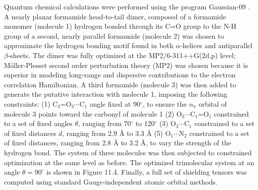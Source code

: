 \begin{doublespace}
Quantum chemical calculations were performed using the program Gaussian-09
\cite{gaussian2009}. A nearly planar formamide head-to-tail dimer,
composed of a formamide monomer (molecule 1) hydrogen bonded through its C=O
group to the N-H group of a second, nearly parallel formamide (molecule 2) was
chosen to approximate the hydrogen bonding motif found in both $\alpha$-helices
and antiparallel $\beta$-sheets. The dimer was fully optimized at the
MP2/6-311++G(2d,p) level; M\"{o}ller-Plesset second order perturbation theory
(MP2) was chosen because it is superior in modeling long-range and dispersive
contributions to the electron correlation Hamiltonian. A third formamide
(molecule 3) was then added to generate the putative \npistar{} interaction
with molecule 1, imposing the following constraints:
(1) C$_3$=O$_3\cdots$C$_1$ angle fixed at 90$^\circ$, to ensure the $n_\pi$
orbital of molecule 3 points toward the carbonyl of molecule
1 (2) O$_3\cdots$C$_1$=O$_1$ constrained to a set of fixed angles $\theta$,
ranging from 70$^\circ$ to 120$^\circ$ (3) O$_3\cdots$C$_1$ constrained to
a set of fixed distances $d$, ranging from 2.9 \r{A} to 3.3 \r{A}
(5) O$_1\cdots$N$_2$ constrained to a set of fixed distances, ranging
from 2.8 \r{A} to 3.2 \r{A}, to vary the strength of the hydrogen bond. The
system of three molecules was then subjected to constrained optimization at the
same level as before. The optimized trimolecular system at an angle
$\theta = 90^\circ$ is shown in Figure 11.4. Finally, a full set of shielding
tensors was computed using standard Gauge-independent atomic orbital methods.
\end{doublespace}

